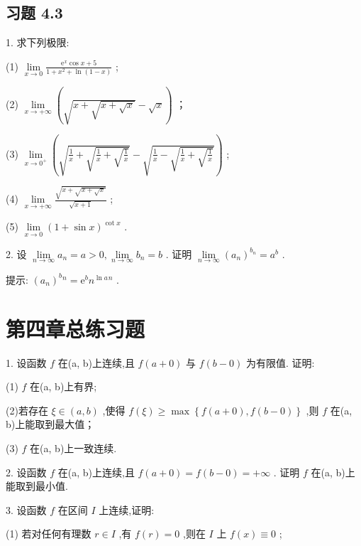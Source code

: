 \subsection{习题 4.3}

1. 求下列极限:

(1) \(\mathop{\lim }\limits_{{x \rightarrow  0}}\frac{{\mathrm{e}}^{x}\cos x + 5}{1 + {x}^{2} + \ln \left( {1 - x}\right) }\) ;

(2) \(\mathop{\lim }\limits_{{x \rightarrow   + \infty }}\left( {\sqrt{x + \sqrt{x + \sqrt{x}}} - \sqrt{x}}\right)\) ；

(3) \(\mathop{\lim }\limits_{{x \rightarrow  {0}^{ + }}}\left( {\sqrt{\frac{1}{x} + \sqrt{\frac{1}{x} + \sqrt{\frac{1}{x}}}} - \sqrt{\frac{1}{x} - \sqrt{\frac{1}{x} + \sqrt{\frac{1}{x}}}}}\right)\) ;

(4) \(\mathop{\lim }\limits_{{x \rightarrow   + \infty }}\frac{\sqrt{x + \sqrt{x + \sqrt{x}}}}{\sqrt{x + 1}}\) ;

(5) \(\mathop{\lim }\limits_{{x \rightarrow  0}}{\left( 1 + \sin x\right) }^{\cot x}\) .

2. 设 \(\mathop{\lim }\limits_{{n \rightarrow  \infty }}{a}_{n} = a > 0,\mathop{\lim }\limits_{{n \rightarrow  \infty }}{b}_{n} = b\) . 证明 \(\mathop{\lim }\limits_{{n \rightarrow  \infty }}{\left( {a}_{n}\right) }^{{b}_{n}} = {a}^{b}\) .

提示: \({\left( {a}_{n}\right) }^{b}{}^{n} = {\mathrm{e}}^{b}{n}^{\ln a}{}^{n}\) .

\section{第四章总练习题}

1. 设函数 \(f\) 在(a, b)上连续,且 \(f\left( {a + 0}\right)\) 与 \(f\left( {b - 0}\right)\) 为有限值. 证明:

(1) \(f\) 在(a, b)上有界;

(2)若存在 \(\xi  \in  \left( {a,b}\right)\) ,使得 \(f\left( \xi \right)  \geq  \max \left\{  {f\left( {a + 0}\right) ,f\left( {b - 0}\right) }\right\}\) ,则 \(f\) 在(a, b)上能取到最大值；

(3) \(f\) 在(a, b)上一致连续.

2. 设函数 \(f\) 在(a, b)上连续,且 \(f\left( {a + 0}\right)  = f\left( {b - 0}\right)  =  + \infty\) . 证明 \(f\) 在(a, b)上能取到最小值.

3. 设函数 \(f\) 在区间 \(I\) 上连续,证明:

(1) 若对任何有理数 \(r \in  I\) ,有 \(f\left( r\right)  = 0\) ,则在 \(I\) 上 \(f\left( x\right)  \equiv  0\) ;

